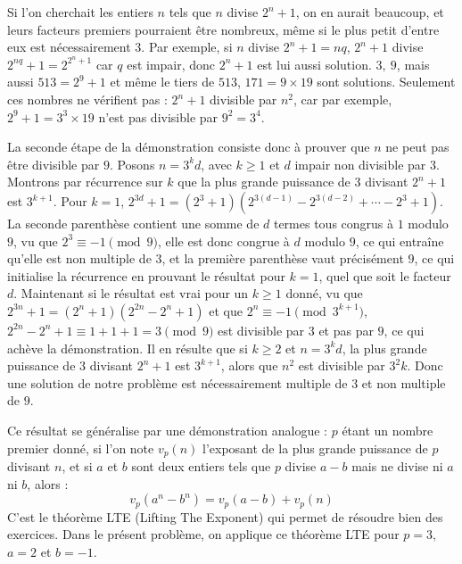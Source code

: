 \begin{sol}
Si l'on cherchait les entiers $n$ tels que $n$ divise $2^n+1$, on en aurait beaucoup, et leurs facteurs premiers pourraient être nombreux, même si le plus petit d'entre eux est nécessairement 3. Par exemple, si $n$ divise $2^n+1 = nq$, $2^n+1$ divise $2^{nq}+1 = 2^{2^n+1}$ car $q$ est impair, donc $2^n+1$ est lui aussi solution. $3, \ 9$, mais aussi $513 = 2^9+1$ et même le tiers de $513$, $171 = 9 \times 19$ sont solutions. Seulement ces nombres ne vérifient pas : $2^n+1$ divisible par $n^2$, car par exemple, $2^9+1 = 3^3 \times 19$ n'est pas divisible par $9^2 = 3^4$. 

La seconde étape de la démonstration consiste donc à prouver que $n$ ne peut pas être divisible par $9$. Posons $n = 3^kd$, avec $k \geq 1$ et $d$ impair non divisible par $3$. Montrons par récurrence sur $k$ que la plus grande puissance de $3$ divisant $2^n+1$ est $3^{k+1}$. Pour $k = 1$, $2^{3d} + 1 = \left( 2^3+1 \right) \left( 2^{3(d-1)} - 2^{3(d-2)} + \cdots - 2^3 + 1 \right)$. La seconde parenthèse contient une somme de $d$ termes tous congrus à $1$ modulo $9$, vu que $2^3 \equiv -1 \pmod{9}$, elle est donc congrue à $d$ modulo $9$, ce qui entraîne qu'elle est non multiple de $3$, et la première parenthèse vaut précisément $9$, ce qui initialise la récurrence en prouvant le résultat pour $k = 1$, quel que soit le facteur $d$. Maintenant si le résultat est vrai pour un $k \geq 1$ donné, vu que $2^{3n}+1 = \left(2^n+1\right)\left(2^{2n}-2^n+1\right)$ et que $2^n \equiv -1 \pmod{3^{k+1}}$, $2^{2n}-2^n+1 \equiv 1+1+1=3 \pmod{9}$ est divisible par $3$ et pas par $9$, ce qui achève la démonstration. Il en résulte que si $k \geq 2$ et $n = 3^kd$, la plus grande puissance de $3$ divisant $2^n+1$ est $3^{k+1}$, alors que $n^2$ est divisible par $3^2k$. Donc une solution de notre problème est nécessairement multiple de $3$ et non multiple de $9$.

Ce résultat se généralise par une démonstration analogue : $p$ étant un nombre premier donné, si l'on note $v_p(n)$ l'exposant de la plus grande puissance de $p$ divisant $n$, et si $a$ et $b$ sont deux entiers tels que $p$ divise $a-b$ mais ne divise ni $a$ ni $b$, alors : $$v_p\left(a^n - b^n\right) = v_p(a-b) + v_p(n)$$ C'est le théorème LTE (Lifting The Exponent) qui permet de résoudre bien des exercices. Dans le présent problème, on applique ce théorème LTE pour $p = 3$,  $a = 2$ et $b = -1$. 


\end{sol}
